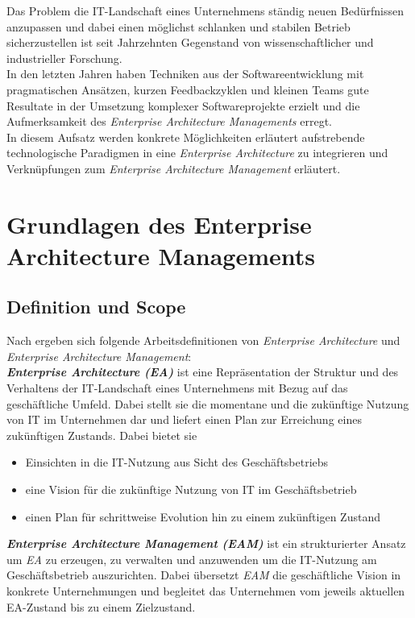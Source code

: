 \documentclass{llncs}
\begin{document}
Das Problem die IT-Landschaft eines Unternehmens ständig neuen Bedürfnissen anzupassen und dabei einen möglichst
schlanken und stabilen Betrieb sicherzustellen ist seit Jahrzehnten Gegenstand von wissenschaftlicher und industrieller Forschung.\\

In den letzten Jahren haben Techniken aus der Softwareentwicklung mit pragmatischen Ansätzen, kurzen Feedbackzyklen und kleinen Teams gute Resultate in der Umsetzung komplexer Softwareprojekte erzielt und die Aufmerksamkeit des \textit{Enterprise Architecture Managements} erregt\cite{buc:mat}.\\

In diesem Aufsatz werden konkrete Möglichkeiten erläutert aufstrebende technologische Paradigmen in eine \textit{Enterprise Architecture} zu integrieren und Verknüpfungen zum \textit{Enterprise Architecture Management} erläutert.

%
\section{Grundlagen des Enterprise Architecture Managements}
\subsection{Definition und Scope}
Nach \cite{ben} ergeben sich folgende Arbeitsdefinitionen von \textit{Enterprise Architecture} und \textit{Enterprise Architecture Management}:\\

\textbf{\textit{Enterprise Architecture (EA)}} ist eine Repräsentation der Struktur und des Verhaltens der IT-Landschaft eines Unternehmens mit Bezug auf das geschäftliche Umfeld. Dabei stellt sie die momentane und die zukünftige Nutzung von IT im Unternehmen dar und liefert einen Plan zur Erreichung eines zukünftigen Zustands. Dabei bietet sie
%
\begin{itemize}
	\item Einsichten in die IT-Nutzung aus Sicht des Geschäftsbetriebs
	\item eine Vision für die zukünftige Nutzung von IT im Geschäftsbetrieb
	\item einen Plan für schrittweise Evolution hin zu einem zukünftigen Zustand
\end{itemize}

%
\textbf{\textit{Enterprise Architecture Management (EAM)}} ist ein strukturierter Ansatz um \textit{EA} zu erzeugen, zu verwalten und anzuwenden um die IT-Nutzung am Geschäftsbetrieb auszurichten. Dabei übersetzt \textit{EAM} die geschäftliche Vision in konkrete Unternehmungen und begleitet das Unternehmen vom jeweils aktuellen EA-Zustand bis zu einem Zielzustand.
 
\end{document}
